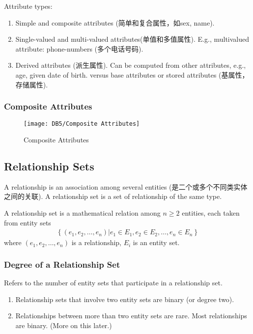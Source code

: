 Attribute types:
\begin{enumerate}\small
    \item Simple and composite attributes (简单和复合属性，如sex, name).
    \item Single-valued and multi-valued attributes(单值和多值属性).
    \subitem E.g., multivalued attribute: phone-numbers (多个电话号码).
    \item Derived attributes (派生属性).
    \subitem Can be computed from other attributes, e.g., age, given date of birth.
    \subitem versus base attributes or stored attributes (基属性，存储属性).
\end{enumerate}

\subsubsection{Composite Attributes}
\begin{figure}[H]
    \centering
    \texttt{[image: DB5/Composite Attributes]}
    \caption{Composite Attributes}
\end{figure}


\subsection{Relationship Sets}
A relationship is an association among several entities (是二个或多个不同类实体之间的关联). A relationship set is a set of relationship of the same type. 

\begin{definition}
    A relationship set is a mathematical relation among $n\ge 2$ entities, each taken from entity sets
    \begin{align*}
        \left\{ (e_1, e_2, \dots, e_n)  | e_1 \in E_1, e_2 \in E_2, \dots, e_n \in E_n \right\}
    \end{align*}
    where $(e_1, e_2, \dots, e_n)$ is a relationship, $E_i$ is an entity set. 
\end{definition}

\subsubsection{Degree of a Relationship Set}
Refers to the number of entity sets that participate in a relationship set.
\begin{enumerate}
    \item Relationship sets that involve two entity sets are binary (or degree two).
    \item Relationships between more than two entity sets are rare. Most relationships are binary. (More on this later.)
\end{enumerate}

